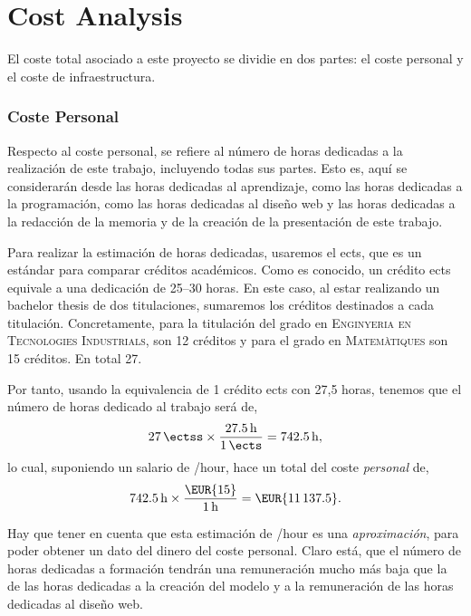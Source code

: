 \section{Cost Analysis}\label{sec:cost}

El coste total asociado a este proyecto se dividie en dos partes: el coste
personal y el coste de infraestructura.

\subsubsection{Coste Personal}

Respecto al coste personal, se refiere al número de horas dedicadas a la
realización de este trabajo, incluyendo todas sus partes. Esto es, aquí se
considerarán desde las horas dedicadas al aprendizaje, como las horas dedicadas
a la programación, como las horas dedicadas al diseño web y las horas dedicadas
a la redacción de la memoria y de la creación de la presentación de este
trabajo.

Para realizar la estimación de horas dedicadas, usaremos el \gls{ects}, que es
un estándar para comparar créditos académicos. Como es conocido, un crédito
\gls{ects} equivale a una dedicación de 25--30 horas. En este caso, al estar
realizando un bachelor thesis de dos titulaciones, sumaremos los créditos
destinados a cada titulación. Concretamente, para la titulación del grado en
\textsc{Enginyeria en Tecnologies Industrials}, son 12 créditos y para el grado
en \textsc{Matemàtiques} son 15 créditos. En total \SI{27}{\ectss}.

Por tanto, usando la equivalencia de 1 crédito \gls{ects} con 27,5 horas,
tenemos que el número de horas dedicado al trabajo será de,
\begin{equation}
  \SI{27}{\ectss} \times \frac{\SI{27.5}{\hour}}{\SI{1}{\ects}} =
  \SI{742.5}{\hour},
\end{equation}
lo cual, suponiendo un salario de /hour, hace un total del coste
\emph{personal} de,
\begin{equation}
  \SI{742.5}{\hour} \times \frac{\text{\EUR{15}}}{\SI{1}{\hour}} =
  \text{\EUR{\num{11137.5}}}.
\end{equation}

\begin{remarkBox}
  Hay que tener en cuenta que esta estimación de /hour es una
  \emph{aproximación}, para poder obtener un dato del dinero del coste
  personal. Claro está, que el número de horas dedicadas a formación tendrán
  una remuneración mucho más baja que la de las horas dedicadas a la creación
  del modelo y a la remuneración de las horas dedicadas al diseño web.
\end{remarkBox}

